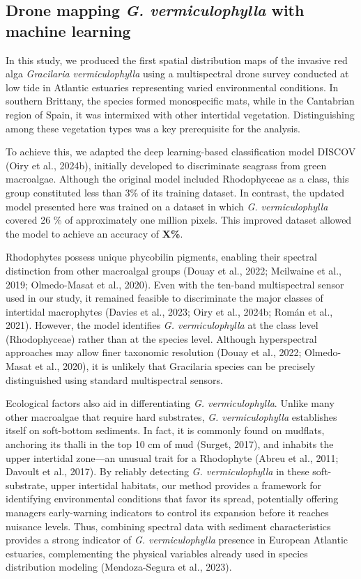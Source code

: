 \documentclass[
  letterpaper,
  DIV=11,
  numbers=noendperiod]{scrartcl}
\begin{document}
\subsection{\texorpdfstring{Drone mapping \emph{G. vermiculophylla} with
machine
learning}{Drone mapping G. vermiculophylla with machine learning}}\label{drone-mapping-g.-vermiculophylla-with-machine-learning}

In this study, we produced the first spatial distribution maps of the
invasive red alga \emph{Gracilaria vermiculophylla} using a
multispectral drone survey conducted at low tide in Atlantic estuaries
representing varied environmental conditions. In southern Brittany, the
species formed monospecific mats, while in the Cantabrian region of
Spain, it was intermixed with other intertidal vegetation.
Distinguishing among these vegetation types was a key prerequisite for
the analysis.

To achieve this, we adapted the deep learning-based classification model
DISCOV (Oiry et al., 2024b), initially developed to discriminate
seagrass from green macroalgae. Although the original model included
Rhodophyceae as a class, this group constituted less than 3\% of its
training dataset. In contrast, the updated model presented here was
trained on a dataset in which \emph{G. vermiculophylla} covered 26 \% of
approximately one million pixels. This improved dataset allowed the
model to achieve an accuracy of \textbf{X\%}.

Rhodophytes possess unique phycobilin pigments, enabling their spectral
distinction from other macroalgal groups (Douay et al., 2022; Mcilwaine
et al., 2019; Olmedo-Masat et al., 2020). Even with the ten-band
multispectral sensor used in our study, it remained feasible to
discriminate the major classes of intertidal macrophytes (Davies et al.,
2023; Oiry et al., 2024b; Román et al., 2021). However, the model
identifies \emph{G. vermiculophylla} at the class level (Rhodophyceae)
rather than at the species level. Although hyperspectral approaches may
allow finer taxonomic resolution (Douay et al., 2022; Olmedo-Masat et
al., 2020), it is unlikely that Gracilaria species can be precisely
distinguished using standard multispectral sensors.

Ecological factors also aid in differentiating \emph{G.
vermiculophylla}. Unlike many other macroalgae that require hard
substrates, \emph{G. vermiculophylla} establishes itself on soft-bottom
sediments. In fact, it is commonly found on mudflats, anchoring its
thalli in the top 10 cm of mud (Surget, 2017), and inhabits the upper
intertidal zone---an unusual trait for a Rhodophyte (Abreu et al., 2011;
Davoult et al., 2017). By reliably detecting \emph{G. vermiculophylla}
in these soft-substrate, upper intertidal habitats, our method provides
a framework for identifying environmental conditions that favor its
spread, potentially offering managers early-warning indicators to
control its expansion before it reaches nuisance levels. Thus, combining
spectral data with sediment characteristics provides a strong indicator
of \emph{G. vermiculophylla} presence in European Atlantic estuaries,
complementing the physical variables already used in species
distribution modeling (Mendoza-Segura et al., 2023).
\end{document}
